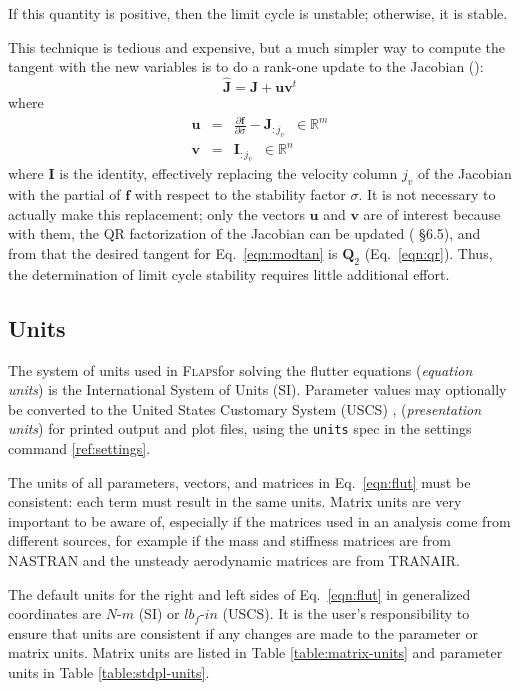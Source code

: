\documentclass[11pt,openany,twoside]{book}
\numberwithin{equation}{section}		%
\newcommand{\Cmd}[1]{{\sf #1}}
\newcommand{\Newterm}[1]{{\em #1}}
\newcommand{\Code}[1]{{\small\tt #1}}
\newcommand{\Flaps}{\textsc{Flaps\:}}
\newcommand{\Nastran}{{\footnotesize{NASTRAN\:}}}
\newcommand{\Matrix}[1]{\boldsymbol{#1}}
\newcommand{\Vector}[1]{\boldsymbol{#1}}
\newcommand{\Eqn}[1]{Eq.\ \ref{#1}}  %
\newcommand{\Tableref}[1]{Table \ref{#1}}
\begin{document}
If this quantity is positive, then the limit cycle is unstable; otherwise,
it is stable.
\par
This technique is tedious and expensive, but
a much simpler way to compute the tangent with the new variables is to do
a rank-one update to the Jacobian (\cite{golub2013matrix}):
\begin{equation}
\hat{\Matrix{J}} = \Matrix{J} + \Vector{u}\Vector{v}^t
\end{equation}
where
\begin{eqnarray}
\Vector{u} &=& \frac{\partial \Vector{f}}{\partial \sigma} - \Matrix{J}_{:j_v} \;\; \in \mathbb{R}^m \nonumber \\
\Vector{v} &=& \Matrix{I}_{:j_v} \;\; \in \mathbb{R}^n
\end{eqnarray}
where $\Matrix{I}$ is the identity,
effectively replacing the velocity column $j_v$ of the Jacobian with the partial
of $\Vector{f}$ with respect to the stability factor $\sigma$.
It is not necessary to actually make this replacement; only the vectors
$\Vector{u}$ and $\Vector{v}$ are of interest because with them,
the QR factorization of the
Jacobian can be updated (\cite{golub2013matrix} \S 6.5), and from that the desired
tangent for \Eqn{eqn:modtan} is $\Matrix{Q}_2$ (\Eqn{eqn:qr}).
Thus, the determination of limit cycle stability requires little additional effort.

\subsection{Units}\label{sect:units}
The system of units used in \Flaps for solving the flutter
equations (\Newterm{equation units}) is the International
System of Units (SI).
Parameter values may optionally be converted to
the United States Customary System (USCS)
\cite{handbook2002specifications},
(\Newterm{presentation units})
for printed output and plot files, using the \Code{units} spec
in the \Cmd{settings} command \ref{ref:settings}.

The units of all parameters, vectors, and matrices in
\Eqn{eqn:flut} must be consistent: each
term must result in the same units.
Matrix units are very important to be aware of, especially
if the matrices used in an analysis come from different sources,
for example if the mass and stiffness matrices are from \Nastran
and the unsteady aerodynamic matrices are from TRANAIR.
\par
The default units for the right and left sides of \Eqn{eqn:flut} in
generalized coordinates are
$N\text{-}m$ (SI) or $lb_f\text{-}in$ (USCS).
It is the user's responsibility to ensure that units are
consistent if any changes are made to the parameter or matrix units.
Matrix units are listed in \Tableref{table:matrix-units} and parameter
units in \Tableref{table:stdpl-units}.
\end{document}
